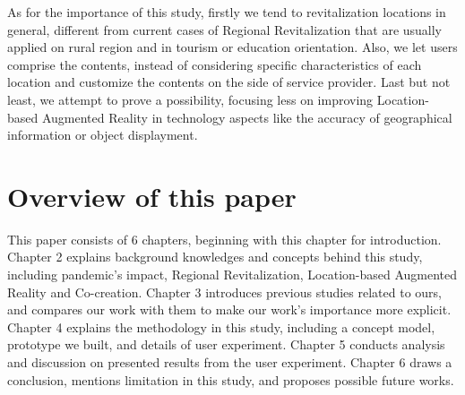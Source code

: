 
As for the importance of this study, firstly we tend to revitalization locations in general, different from current cases of Regional Revitalization that are usually applied on rural region and in tourism or education orientation.
Also, we let users comprise the contents, instead of considering specific characteristics of each location and customize the contents on the side of service provider.
Last but not least, we attempt to prove a possibility, focusing less on improving Location-based Augmented Reality in technology aspects like the accuracy of geographical information or object displayment.

\section{Overview of this paper}
This paper consists of 6 chapters, beginning with this chapter for introduction.
Chapter 2 explains background knowledges and concepts behind this study, including pandemic's impact, Regional Revitalization, Location-based Augmented Reality and Co-creation.
Chapter 3 introduces previous studies related to ours, and compares our work with them to make our work's importance more explicit.
Chapter 4 explains the methodology in this study, including a concept model, prototype we built, and details of user experiment.
Chapter 5 conducts analysis and discussion on presented results from the user experiment.
Chapter 6 draws a conclusion, mentions limitation in this study, and proposes possible future works.
